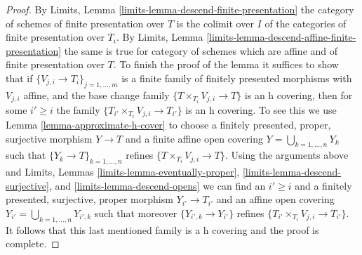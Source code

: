 \documentclass[10pt,a4paper]{amsart}
\theoremstyle{plain}
\theoremstyle{definition}
\theoremstyle{remark}
\numberwithin{equation}{subsection}
\begin{document}
\begin{proof}
By Limits, Lemma \ref{limits-lemma-descend-finite-presentation}
the category of schemes of finite presentation over $T$ is the
colimit over $I$ of the categories of finite presentation over $T_i$. By
Limits, Lemma \ref{limits-lemma-descend-affine-finite-presentation}
the same is true for category of schemes which are affine and
of finite presentation over $T$.
To finish the proof of the lemma it suffices to show that if
$\{V_{j, i} \to T_i\}_{j = 1, \ldots, m}$ is a finite family of
finitely presented morphisms with $V_{j, i}$ affine, and the
base change family $\{T \times_{T_i} V_{j, i} \to T\}$ is
an h covering, then for some $i' \geq i$ the family
$\{T_{i'} \times_{T_i} V_{j, i} \to T_{i'}\}$ is an h covering.
To see this we use Lemma \ref{lemma-approximate-h-cover} to
choose a finitely presented, proper, surjective
morphism $Y \to T$ and a finite affine open covering
$Y = \bigcup_{k = 1, \ldots, n} Y_k$ such that
$\{Y_k \to T\}_{k = 1, \ldots, n}$ refines
$\{T \times_{T_i} V_{j, i} \to T\}$.
Using the arguments above and
Limits, Lemmas \ref{limits-lemma-eventually-proper},
\ref{limits-lemma-descend-surjective}, and
\ref{limits-lemma-descend-opens}
we can find an $i' \geq i$ and a finitely presented, surjective, proper
morphism $Y_{i'} \to T_{i'}$ and an affine open covering
$Y_{i'} = \bigcup_{k = 1, \ldots, n} Y_{i', k}$
such that moreover $\{Y_{i', k} \to Y_{i'}\}$ refines
$\{T_{i'} \times_{T_i} V_{j, i} \to T_{i'}\}$.
It follows that this last mentioned family is
a h covering and the proof is complete.
\end{proof}
\end{document}

